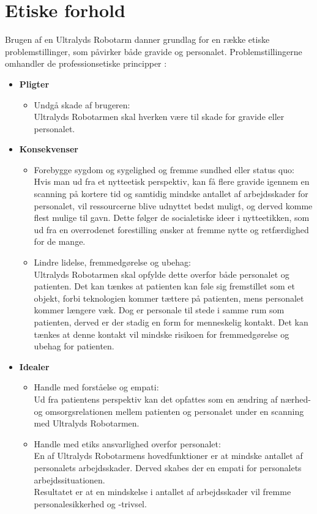 \section{Etiske forhold}
Brugen af en Ultralyds Robotarm danner grundlag for en række etiske problemstillinger, som påvirker både gravide og personalet. 
Problemstillingerne omhandler de professionsetiske principper \cite{Husted}: 
\begin{itemize}
	\item \textbf{Pligter}
	\begin{itemize}
		\item Undgå skade af brugeren:\\ 
		Ultralyds Robotarmen skal hverken være til skade for gravide eller personalet. 
	\end{itemize} 
	\item \textbf{Konsekvenser}
	\begin{itemize}
		\item Forebygge sygdom og sygelighed og fremme sundhed eller status quo: \\
		Hvis man ud fra et nytteetisk perspektiv, kan få flere gravide igennem en scanning på kortere tid og samtidig mindske antallet af arbejdsskader for personalet, vil ressourcerne blive udnyttet bedst muligt, og derved komme flest mulige til gavn. Dette følger de socialetiske ideer i nytteetikken, som ud fra en overrodenet forestilling ønsker at fremme nytte og retfærdighed for de mange.    
		\item Lindre lidelse, fremmedgørelse og ubehag:\\
		Ultralyds Robotarmen skal opfylde dette overfor både personalet og patienten. Det kan tænkes at patienten kan føle sig fremstillet som et objekt, forbi teknologien kommer tættere på patienten, mens personalet kommer længere væk. Dog er personale til stede i samme rum som patienten, derved er der stadig en form for menneskelig kontakt. Det kan tænkes at denne kontakt vil mindske risikoen for fremmedgørelse og ubehag for patienten.   
	\end{itemize}
	\item \textbf{Idealer}
	\begin{itemize}
		\item Handle med forståelse og empati:\\
		Ud fra patientens perspektiv kan det opfattes som en ændring af nærhed- og omsorgsrelationen mellem patienten og personalet under en scanning med Ultralyds Robotarmen. 
		\item Handle med etiks ansvarlighed overfor personalet:\\
		En af Ultralyds Robotarmens hovedfunktioner er at mindske antallet af personalets arbejdsskader. Derved skabes der en empati for personalets arbejdssituationen.\\
		Resultatet er at en mindskelse i antallet af arbejdsskader vil fremme personalesikkerhed og -trivsel.   		
	\end{itemize} 
\end{itemize} 

